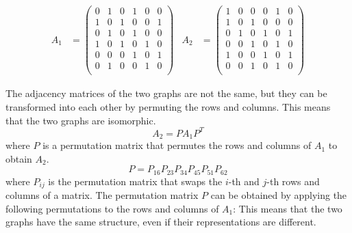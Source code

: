 \documentclass[11pt]{article}
\begin{document}
\begin{align*}
    A_1 &= \begin{pmatrix}
        0 & 1 & 0 & 1 & 0 & 0 \\
        1 & 0 & 1 & 0 & 0 & 1 \\
        0 & 1 & 0 & 1 & 0 & 0 \\
        1 & 0 & 1 & 0 & 1 & 0 \\
        0 & 0 & 0 & 1 & 0 & 1 \\
        0 & 1 & 0 & 0 & 1 & 0 \\
    \end{pmatrix} &
    A_2 &= \begin{pmatrix}
        1 & 0 & 0 & 0 & 1 & 0 \\
        1 & 0 & 1 & 0 & 0 & 0 \\
        0 & 1 & 0 & 1 & 0 & 1 \\
        0 & 0 & 1 & 0 & 1 & 0 \\
        1 & 0 & 0 & 1 & 0 & 1 \\
        0 & 0 & 1 & 0 & 1 & 0 \\
    \end{pmatrix}
\end{align*}

The adjacency matrices of the two graphs are not the same, but they can be transformed into each other by permuting the rows and columns. This means that the two graphs are isomorphic.
\[
A_2 = P A_1 P^T
\]
where $P$ is a permutation matrix that permutes the rows and columns of $A_1$ to obtain $A_2$.
\[
P = P_{16} P_{23} P_{34} P_{45} P_{51} P_{62}
\]
where $P_{ij}$ is the permutation matrix that swaps the $i$-th and $j$-th rows and columns of a matrix. The permutation matrix $P$ can be obtained by applying the following permutations to the rows and columns of $A_1$:
This means that the two graphs have the same structure, even if their representations are different.
   
\end{document}
